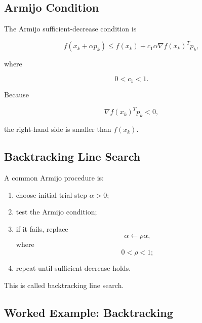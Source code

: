 \subsection{Armijo Condition}
\label{subsec:armijo-condition}

The Armijo sufficient-decrease condition is

\[
\boxed{
f(x_k+\alpha p_k)
\leq
f(x_k)
+
c_1
\alpha
\nabla f(x_k)^Tp_k,
}
\]

where

\[
\boxed{
0<c_1<1.
}
\]

Because

\[
\nabla f(x_k)^Tp_k<0,
\]

the right-hand side is smaller than \(f(x_k)\).

\subsection{Backtracking Line Search}
\label{subsec:backtracking-line-search}

A common Armijo procedure is:

\begin{enumerate}
    \item choose initial trial step \(\alpha>0\);
    \item test the Armijo condition;
    \item if it fails, replace
    \[
    \alpha
    \leftarrow
    \rho\alpha,
    \]
    where
    \[
    0<\rho<1;
    \]
    \item repeat until sufficient decrease holds.
\end{enumerate}

This is called backtracking line search.

\subsection{Worked Example: Backtracking}
\label{subsec:worked-backtracking}

